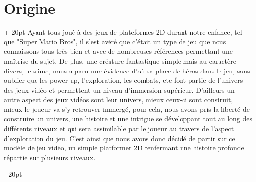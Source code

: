 \documentclass[a4paper, 12pt, twoside]{article}
\newcommand{\ind}[1][20pt]{\advance\leftskip + #1}
\newcommand{\deind}[1][20pt]{\advance\leftskip - #1}
\newenvironment{indt}[2][20pt]{#2 \par \ind[#1]}{\par \deind} %
\begin{document}
    \newpage

    \begin{indt}{\section{Origine}}
        Ayant tous joué à des jeux de plateformes 2D durant notre enfance, tel que "Super Mario Bros", il s'est avéré que c'était un type de jeu que nous connaissons tous très bien et avec de nombreuses références permettant une maîtrise du sujet. De plus, une créature fantastique simple mais au caractère divers, le slime, nous a paru une évidence d'où sa place de héros dans le jeu, sans oublier que les power up, l'exploration, les combats, etc font partie de l'univers des jeux vidéo et permettent un niveau d'immersion supérieur. D'ailleurs un autre aspect des jeux vidéos sont leur univers, mieux ceux-ci sont construit, mieux le joueur va s'y retrouver immergé, pour cela, nous avons pris la liberté de construire un univers, une histoire et une intrigue se développant tout au long des différents niveaux et qui sera assimilable par le joueur au travers de l'aspect d'exploration du jeu. C'est ainsi que nous avons donc décidé de partir sur ce modèle de jeu vidéo, un simple platformer 2D renfermant une histoire profonde répartie sur plusieurs niveaux.
    \end{indt}
\end{document}

